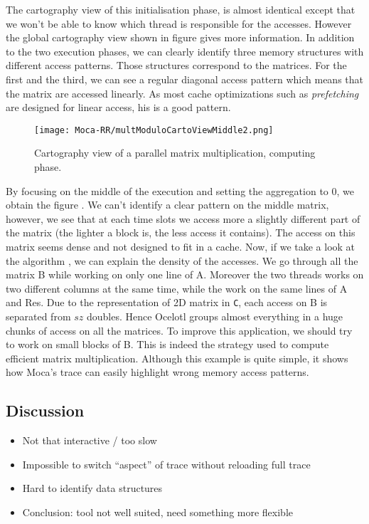 The cartography view of this initialisation phase, is almost identical except that we won't be able to know which thread is responsible for the accesses.
However the global cartography view shown in figure  gives more information.
In addition to the two execution phases, we can clearly identify three memory structures with different access patterns.
Those structures correspond to the matrices.
For the first and the third, we can see a regular diagonal access pattern which means that the matrix are accessed linearly.
As most cache optimizations such as \emph{prefetching} are designed for linear access, his is a good pattern.

\begin{figure}[htb]
    \centering
    \texttt{[image: Moca-RR/multModuloCartoViewMiddle2.png]}
    \caption{Cartography view of a parallel matrix multiplication, computing
    phase.}
    \label{fig:ocelotl-Carto2}
\end{figure}

By focusing on the middle of the execution and setting the aggregation to $0$, we obtain the figure .
We can't identify a clear pattern on the middle matrix, however, we see that at each time slots we access more a slightly different part of the matrix (the lighter a block is, the less access it contains).
The access on this matrix seems  dense and not designed to fit in a cache.
Now, if we take a look at the algorithm , we can explain the density of the accesses.
We go through all the matrix B while working on only one line of A.
Moreover the two threads works on two different columns at the same time, while the work on the same lines of A and Res.
Due to the representation of 2D matrix in \texttt{C}, each access on B is separated from $sz$ doubles.
Hence \gls{Ocelotl} groups almost everything in a huge chunks of access on all the matrices.
To improve this application, we should try to work on small blocks of B.
This is indeed the strategy used to compute efficient matrix multiplication.
Although this example is quite simple, it shows how \gls{Moca}'s trace can easily highlight wrong memory access patterns.

\subsection{Discussion}

\begin{itemize}
    \item  Not that interactive / too slow
    \item  Impossible to switch “aspect” of trace without reloading full trace
    \item  Hard to identify data structures
    \item  Conclusion: tool not well suited, need something more flexible
\end{itemize}


